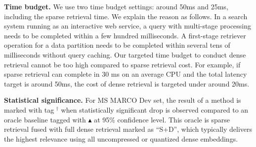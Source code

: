 {\bf Time budget.}
We use  two time budget settings: around 50ms  and 25ms, including the  sparse retrieval time.
We explain the reason as follows.
In a search system running as an interactive  web service,  a query with multi-stage processing
needs to be completed within a few hundred milliseconds.
A first-stage retriever operation  for a data partition needs to be completed within several tens of milliseconds without query caching.
Our targeted time budget to conduct dense retrieval cannot be too high     compared to  sparse retrieval cost.
For example, if sparse retrieval can complete  in 30 ms on an  average CPU and the total latency
target is around 50ms,  the cost of dense retrieval is targeted under around  20ms.



{\bf Statistical significance.}
For MS MARCO Dev set, the result of a method is marked with  tag $^\dag$ when 
statistically significant drop is observed compared to  an oracle baseline
tagged with $\blacktriangle$ at 95\% confidence level.  This oracle
is sparse retrieval fused with full dense retrieval marked as ``S+D'', which typically delivers the highest relevance  
using all uncompressed or quantized dense embeddings.


